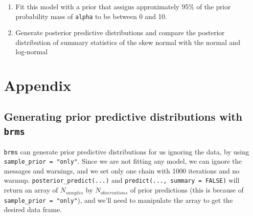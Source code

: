 \documentclass[12pt,]{krantz}
\providecommand{\tightlist}{%
  \setlength{\itemsep}{0pt}\setlength{\parskip}{0pt}}
\theoremstyle{definition}
\theoremstyle{definition}
\theoremstyle{definition}
\theoremstyle{remark}
\begin{document}
\begin{enumerate}
\def\labelenumi{\alph{enumi}.}
\tightlist
\item
  Fit this model with a prior that assigns approximately 95\% of the prior probability mass of \texttt{alpha} to be between 0 and 10.
\item
  Generate posterior predictive distributions and compare the posterior distribution of summary statistics of the skew normal with the normal and log-normal
\end{enumerate}

\hypertarget{appendix}{%
\section{Appendix}\label{appendix}}

\hypertarget{app:pp}{%
\subsection{\texorpdfstring{Generating prior predictive distributions with \texttt{brms}}{Generating prior predictive distributions with brms}}\label{app:pp}}

\texttt{brms} can generate prior predictive distributions for us ignoring the data, by using \texttt{sample\_prior\ =\ "only"}. Since we are not fitting any model, we can ignore the messages and warnings, and we set only one chain with 1000 iterations and no warmup. \texttt{posterior\_predict(...)} and \texttt{predict(...,\ summary\ =\ FALSE)} will return an array of \(N_{samples}\) by \(N_{observations}\) of prior predictions (this is because of \texttt{sample\_prior\ =\ "only"}), and we'll need to manipulate the array to get the desired data frame.
\end{document}
